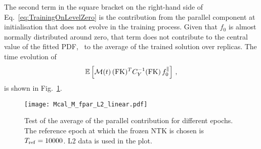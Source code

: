 The second term in the square bracket on the right-hand side of
Eq.~\eqref{eq:TrainingOnLevelZero} is the contribution from the parallel
component at initialisation that does not evolve in the training process. Given
that $f_0$ is almost normally distributed around zero, that term does not
contribute to the central value of the fitted PDF, \ie\ to the average of the
trained solution over replicas. The time evolution of 
\begin{align}
  \label{eq:AverageLevelZeroUcheck}
  \mathbb{E}\left[\mathcal{M}(t)\, (\mathrm{FK})^T C_{Y}^{-1} (\mathrm{FK})\, 
    f_{0}^\parallel\right]\, ,
\end{align}
is shown in Fig.~\ref{fig:AverageLevelZeroUcheck}.
\begin{figure}[h!]
  \centering
  \texttt{[image: Mcal\_M\_fpar\_L2\_linear.pdf]} 
  \caption{Test of the average of the parallel contribution for different
  epochs. The reference epoch at which the frozen NTK is chosen is $T_{\rm ref}
  = 10000$. L2 data is used in the plot.}
  \label{fig:AverageLevelZeroUcheck}
\end{figure}

